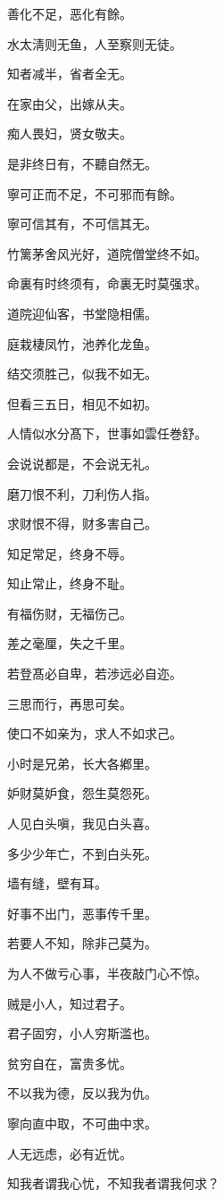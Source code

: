 \documentclass[12pt,oneside]{book}
\begin{document}
善化不足，恶化有餘。

水太淸则无鱼，人至察则无徒。

知者减半，省者全无。

在家由父，出嫁从夫。

痴人畏妇，贤女敬夫。

是非终日有，不聽自然无。

寧可正而不足，不可邪而有餘。

寧可信其有，不可信其无。

竹篱茅舍风光好，道院僧堂终不如。

命裏有时终须有，命裏无时莫强求。

道院迎仙客，书堂隐相儒。

庭栽棲凤竹，池养化龙鱼。

结交须胜己，似我不如无。

但看三五日，相见不如初。

人情似水分髙下，世事如雲任巻舒。

会说说都是，不会说无礼。

磨刀恨不利，刀利伤人指。

求财恨不得，财多害自己。

知足常足，终身不辱。

知止常止，终身不耻。

有福伤财，无福伤己。

差之毫厘，失之千里。

若登髙必自卑，若渉远必自迩。

三思而行，再思可矣。

使口不如亲为，求人不如求己。

小时是兄弟，长大各鄕里。

妒财莫妒食，怨生莫怨死。

人见白头嗔，我见白头喜。

多少少年亡，不到白头死。

墙有缝，壁有耳。

好事不出门，恶事传千里。

若要人不知，除非己莫为。

为人不做亏心事，半夜敲门心不惊。

贼是小人，知过君子。

君子固穷，小人穷斯滥也。

贫穷自在，富贵多忧。

不以我为德，反以我为仇。

寧向直中取，不可曲中求。

人无远虑，必有近忧。

知我者谓我心忧，不知我者谓我何求？
\end{document}
